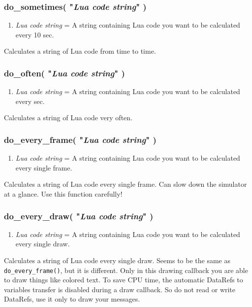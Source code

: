 \documentclass[11pt,parskip=half,a4paper]{scrartcl}
\begin{document}
\subsubsection{do\_sometimes( "\emph{Lua code string}" )}

\begin{enumerate}
	\item \emph{Lua code string} = A string containing Lua code you want to be calculated every 10 sec.
\end{enumerate}

Calculates a string of Lua code from time to time.

\subsubsection{do\_often( "\emph{Lua code string}" )}

\begin{enumerate}
	\item \emph{Lua code string} = A string containing Lua code you want to be calculated every sec.
\end{enumerate}

Calculates a string of Lua code very often.

\subsubsection{do\_every\_frame( "\emph{Lua code string}" )}

\begin{enumerate}
	\item \emph{Lua code string} = A string containing Lua code you want to be calculated every single frame.
\end{enumerate}

Calculates a string of Lua code every single frame. Can slow down the simulator at a glance. Use this function carefully!

\subsubsection{do\_every\_draw( "\emph{Lua code string}" )}

\begin{enumerate}
	\item \emph{Lua code string} = A string containing Lua code you want to be calculated every single draw.
\end{enumerate}

Calculates a string of Lua code every single draw. Seems to be the same as \verb|do_every_frame()|, but it is different. Only in this drawing callback you are able to draw things like colored text. To save CPU time, the automatic DataRefs to variables transfer is disabled during a draw callback. So do not read or write DataRefs, use it only to draw your messages.
\end{document}
